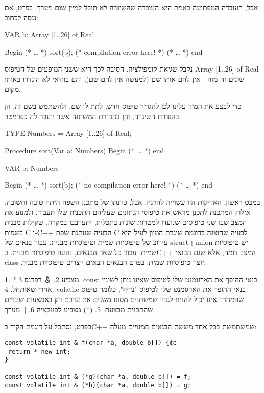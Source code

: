       אבל, העובדה המפתיעה באמת היא העובדה שהשיגרה לא תוכל למיין שום מערך. בפרט, אם ננסה לכתוב:

      VAR
      b: Array [1..26] of Real

      Begin
      (* … *)
      sort(b); (* compilation error here! *)
      (* … *)
      end

      נקבל שגיאת קומפילציה. הסיבה לכך היא ששני המופעים של הטיפוס Array [1..26] of Real שונים זה מזה - אין להם אותו שם (למעשה אין להם שם), והם בוודאי לא הוגדרו באותו מקום.

      כדי לבצע את המיון עלינו לכן להגדיר טיפוס חדש, לתת לו שם, ולהשתמש בשם זה, הן בהגדרת השיגרה, והן בהגדרת המשתנה אשר יועבר לה כפרמטר.

      TYPE
      Numbers = Array [1..26] of Real;

      Procedure sort(Var a: Numbers)
      Begin
      (* … *)
      end

      VAR
      b: Numbers

      Begin
      (* … *)
      sort(b); (* no compilation error here! *)
      (* … *)
      end

      במבט ראשון, האדיקות הזו עשוייה להרגיז. אבל, כוונתו של מתכנן השפה היתה טובה וחשובה: אילוץ המתכנת לתכנן מראש את טיפוסי הנתונים שעליהם התכנית שלו תעבוד, ולמנוע את המצב שבו שני טיפוסים שנועדו למטרות שונות בתכלית, יתערבבו במקרה.
      שקילות מבנית בשפות C וְ-C++
      הבעיה שנותנת שְׂפַת C לבעיה שהוצגה בדוגמת שיגרת המיון לעיל היא עירוב של טיפוסיות שמית וטיפוסיות מבנית. עבור בנאים של struct וְ-union יש טיפוסיות שמית. עבור כל שאר הבנאים, נהוגה טיפוסיות מבנית. בC++ המצב דומה, אלא שגם הבנאי class יוצר טיפוסיות שמית. בפרט הבנאים הבאים יוצרים טיפוסיות מבנית:

      1. * מצביע
      2. ＆ רפרנס
      3. const בנאי ההופך את הארגומנט שלו לטיפוס שאינו ניתן לשינוי אחרי שאותחל.
      4. volatile בנאי ההופך את הארגומנט שלו לטיפוס "נדיף", כלומר טיפוס שהמהדר אינו יכול להניח לגביו שמשתנים מסוגו משנים את ערכם רק באמצעות שינויים שהתכנית מבצעת.
      5. (*) מצביע לפונקציה
      6. [] מערך.

      בפרט, נסתכל על דוגמת הקוד בC++ שמשתמשת בכל אחד מששת הבנאים המנויים מעלה:

\begin{verbatim}
const volatile int & f(char *a, double b[]) {¢¢
 return * new int;
}

const volatile int & (*g)(char *a, double b[]) = f;
const volatile int & (*h)(char *a, double b[]) = g;
\end{verbatim}

